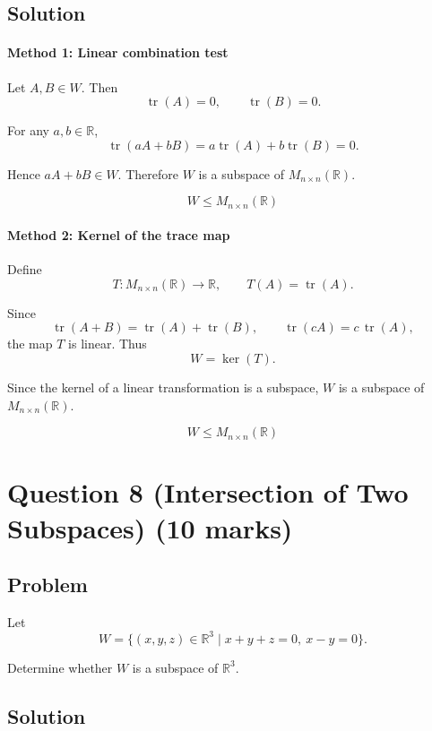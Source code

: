 \documentclass[12pt]{article}
\begin{document}
\subsection{Solution}

\paragraph{Method 1: Linear combination test}

Let \(A,B\in W\). Then
\[
\operatorname{tr}(A)=0,\qquad \operatorname{tr}(B)=0.
\]

For any \(a,b\in\mathbb R\),
\[
\operatorname{tr}(aA+bB)=a\operatorname{tr}(A)+b\operatorname{tr}(B)=0.
\]

Hence \(aA+bB\in W\). Therefore \(W\) is a subspace of \(M_{n\times n}(\mathbb R)\).

\[
\boxed{W\le M_{n\times n}(\mathbb R)}
\]

\paragraph{Method 2: Kernel of the trace map}

Define
\[
T:M_{n\times n}(\mathbb R)\to\mathbb R,\qquad T(A)=\operatorname{tr}(A).
\]

Since
\[
\operatorname{tr}(A+B)=\operatorname{tr}(A)+\operatorname{tr}(B),
\qquad
\operatorname{tr}(cA)=c\,\operatorname{tr}(A),
\]
the map \(T\) is linear. Thus
\[
W=\ker(T).
\]

Since the kernel of a linear transformation is a subspace, \(W\) is a subspace of \(M_{n\times n}(\mathbb R)\).

\[
\boxed{W\le M_{n\times n}(\mathbb R)}
\]

\newpage
\section{Question 8 (Intersection of Two Subspaces) \hfill (10 marks)}
\subsection{Problem}

Let
\[
W=\{(x,y,z)\in\mathbb R^3\mid x+y+z=0,\ x-y=0\}.
\]

Determine whether \(W\) is a subspace of \(\mathbb R^3\).

\subsection{Solution}
\end{document}
